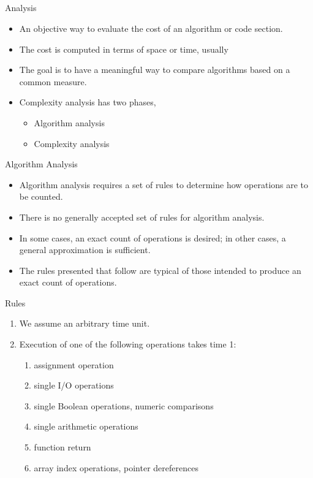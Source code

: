 \documentclass{beamer}
\begin{document}
\subsection{}
\begin{frame}{Analysis}
\begin{itemize}
\item An objective way to evaluate the cost of an algorithm or code section.  
\item The cost is computed in terms of space or time, usually
\item The goal is to have a meaningful way to compare algorithms based on a common measure.
\item Complexity analysis has two phases,
\begin{itemize}
\item Algorithm analysis
\item Complexity analysis
\end{itemize}
\end{itemize}
\end{frame}

\begin{frame}{Algorithm Analysis}
\begin{itemize}
\item Algorithm analysis requires a set of rules to determine how operations are to be counted.
\item There is no generally accepted set of rules for algorithm analysis.
\item In some cases, an exact count of operations is desired; in other cases, a general approximation is sufficient.
\item The rules presented that follow are typical of those intended to produce an exact count of operations.
\end{itemize}
\end{frame}

\begin{frame}{Rules}
\begin{enumerate}
\item We assume an arbitrary time unit.
\item Execution of one of the following operations takes time 1:
\begin{enumerate}
\item assignment operation
\item single I/O operations
\item single Boolean operations, numeric comparisons
\item single arithmetic operations
\item function return
\item array index operations, pointer dereferences
\end{enumerate}
\end{enumerate}
\end{frame}
\end{document}
